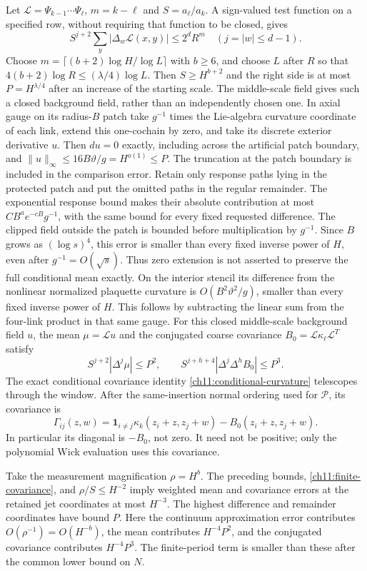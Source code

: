 Let $\mathcal L=\Psi_{k-1}\cdots\Psi_\ell$,
$m=k-\ell$ and $S=a_\ell/a_k$.
A sign-valued test function on a specified row, without requiring that function to be closed, gives
\[
 S^{j+2}\sum_y|\Delta_w\mathcal L(x,y)|
       \le2^d R^m\quad(j=|w|\le d-1).
\]
Choose $m=\lceil(b+2)\log H/\log L\rceil$ with $b\ge6$,
and choose $L$ after $R$ so that
$4(b+2)\log R\le(\lambda/4)\log L$.
Then $S\ge H^{b+2}$ and the right side is at most
$P=H^{\lambda/4}$ after an increase of the starting scale.
The middle-scale field gives such a closed background field,
rather than an independently chosen one. In axial gauge on its
radius-$B$ patch take $g^{-1}$ times the Lie-algebra curvature
coordinate of each link, extend this one-cochain by zero, and
take its discrete exterior derivative $u$. Then $du=0$ exactly,
including across the artificial patch boundary, and
$\|u\|_\infty\le16B\vartheta/g=H^{o(1)}\le P$.
The truncation at the patch boundary is included in the
comparison error. Retain only response paths lying in the protected
patch and put the omitted paths in the regular remainder.
The exponential response bound makes their absolute contribution
at most $C B^a e^{-cB}g^{-1}$, with the same bound for every fixed
requested difference. The clipped field outside the patch is
bounded before multiplication by $g^{-1}$.
Since $B$ grows as $(\log s)^4$, this error is smaller than every
fixed inverse power of $H$, even after $g^{-1}=O(\sqrt s)$.
Thus zero extension is not asserted to preserve the full
conditional mean exactly.
On the interior stencil its difference from the nonlinear normalized
plaquette curvature is $O(B^2\vartheta^2/g)$, smaller than every
fixed inverse power of $H$. This follows by subtracting the
linear sum from the four-link product in that same gauge.
For this closed middle-scale background field $u$,
the mean $\mu=\mathcal Lu$ and the conjugated coarse covariance
$B_0=\mathcal L\kappa_\ell\mathcal L^T$ satisfy
\[
 S^{j+2}|\Delta^j\mu|\le P^2,\qquad
 S^{j+h+4}|\Delta^j\Delta^hB_0|\le P^3.
\]
The exact conditional covariance identity
\eqref{ch11:conditional-curvature} telescopes through the window.
After the same-insertion normal ordering used for
$\mathscr P$, its covariance is
\[
 \Gamma_{ij}(z,w)=\mathbf1_{i\ne j}
       \kappa_k(z_i+z,z_j+w)-B_0(z_i+z,z_j+w).
\]
In particular its diagonal is $-B_0$, not zero.
It need not be positive; only the polynomial Wick evaluation
uses this covariance.

Take the measurement magnification $\rho=H^b$.
The preceding bounds, \eqref{ch11:finite-covariance}, and
$\rho/S\le H^{-2}$ imply weighted mean and covariance errors
at the retained jet coordinates at most $H^{-3}$.
The highest difference and remainder coordinates have bound $P$.
Here the continuum approximation error contributes
$O(\rho^{-1})=O(H^{-b})$, the mean contributes
$H^{-4}P^2$, and the conjugated covariance contributes
$H^{-4}P^3$. The finite-period term is smaller than these
after the common lower bound on $N$.


